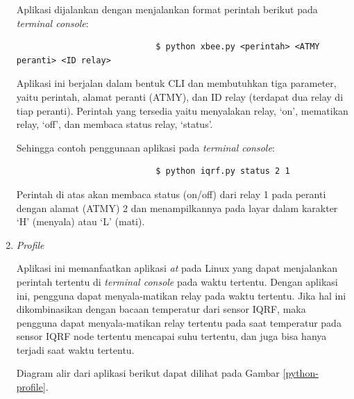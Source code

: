 \begin{enumerate}
					Aplikasi dijalankan dengan menjalankan format perintah berikut pada \emph{terminal console}:
					\begingroup
					    \fontsize{10pt}{12pt}\selectfont
					    \begin{verbatim}
							$ python xbee.py <perintah> <ATMY peranti> <ID relay>
					    \end{verbatim}  
					\endgroup

					Aplikasi ini berjalan dalam bentuk CLI dan membutuhkan tiga parameter, yaitu perintah, alamat peranti (ATMY), dan ID relay (terdapat dua relay di tiap peranti). Perintah yang tersedia yaitu menyalakan relay, `on', mematikan relay, `off', dan membaca status relay, `status'.

					Sehingga contoh penggunaan aplikasi pada \emph{terminal console}:
					\begingroup
					    \fontsize{10pt}{12pt}\selectfont
					    \begin{verbatim}
							$ python iqrf.py status 2 1
					    \end{verbatim}  
					\endgroup
					Perintah di atas akan membaca status (on/off) dari relay 1 pada peranti dengan alamat (ATMY) 2 dan menampilkannya pada layar dalam karakter `H' (menyala) atau `L' (mati).

				\item \emph{Profile}

					Aplikasi ini memanfaatkan aplikasi \emph{at} pada Linux yang dapat menjalankan perintah tertentu di \emph{terminal console} pada waktu tertentu. Dengan aplikasi ini, pengguna dapat menyala-matikan relay pada waktu tertentu. Jika hal ini dikombinasikan dengan bacaan temperatur dari sensor IQRF, maka pengguna dapat menyala-matikan relay tertentu pada saat temperatur pada sensor IQRF node tertentu mencapai suhu tertentu, dan juga bisa hanya terjadi saat waktu tertentu.

					Diagram alir dari aplikasi berikut dapat dilihat pada Gambar \ref{python-profile}.


\end{enumerate}
